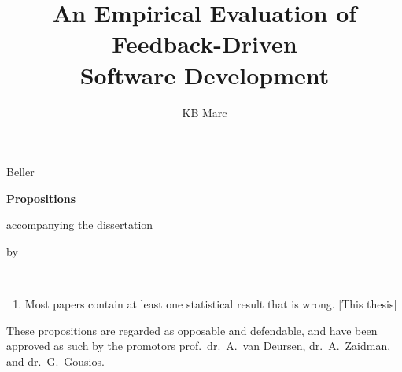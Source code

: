 \documentclass{propositions}
\begin{document}
\title{An Empirical Evaluation of Feedback-Driven \\Software Development}
\author{KB Marc}{Beller}

\begin{center}

{\Large\titlefont\bfseries Propositions}

\medskip

accompanying the dissertation

\medskip

{\makeatletter
\titlestyle\bfseries\large\@title
\makeatother}

{\makeatletter
\ifx\@subtitle\undefined\else
    \titlefont\titleshape\@subtitle
\fi
\makeatother}

\medskip

by

\medskip

\makeatletter
{\large\titlefont\bfseries\@firstname\ {\titleshape\@lastname}}
\makeatother

\end{center}

\bigskip

\begin{enumerate}
\item Most papers contain at least one statistical result that is wrong. [This
  thesis]
\end{enumerate}

\bigskip
\bigskip

\begin{center}
These propositions are regarded as opposable and defendable, and have been approved as such by the
promotors prof.\ dr.\ A.\ van Deursen, dr.\ A.\ Zaidman, and dr.\ G.\ Gousios.
\end{center}





\end{document}
